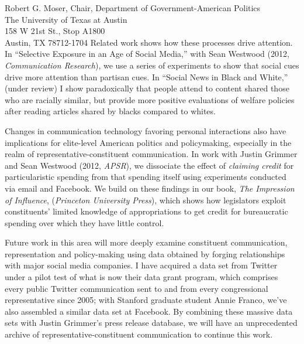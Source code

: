 \documentclass[fontsize=12pt, paper=a4]{scrlttr2}
\begin{document}
\begin{letter}{Robert G. Moser, Chair, Department of Government-American Politics\\
The University of Texas at Austin\\
158 W 21st St., Stop A1800\\
Austin, TX 78712-1704}
Related work shows how these processes drive attention. In ``Selective Exposure in an Age of Social Media,'' with Sean Westwood (2012, \emph{Communication Research}), we use a series of experiments to show that social cues drive more attention than partisan cues.  %
In ``Social News in Black and White,'' (under review) I show paradoxically that people attend to content shared those who are racially similar, but provide more positive evaluations of welfare policies after reading articles shared by blacks compared to whites.  

Changes in communication technology favoring personal interactions also have implications for elite-level American politics and policymaking, especially in the realm of representative-constituent communication.  In work with Justin Grimmer and Sean Westwood (2012, \emph{APSR}), we dissociate the effect of \emph{claiming credit} for particularistic spending from that spending itself using  experiments conducted via email and Facebook.  %
We build on these findings in our book, \emph{The Impression of Influence}, (\emph{Princeton University Press}), which shows how legislators exploit constituents' limited knowledge of appropriations to get credit for bureaucratic spending over which they have little control.  

Future work in this area will more deeply examine constituent communication, representation and policy-making using data obtained by forging relationships with major social media companies.  I have acquired a data set from Twitter under a pilot test of what is now their data grant program, which comprises every public Twitter communication sent to and from every congressional representative since 2005; with Stanford graduate student Annie Franco, we've also assembled a similar data set at Facebook.  By combining these massive data sets with Justin Grimmer's press release database, we will have an unprecedented archive of representative-constituent communication to continue this work.


\end{letter}
\end{document}
